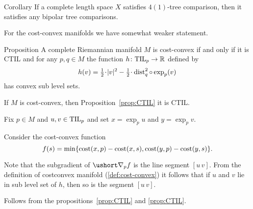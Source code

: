 \begin{thm}{Corollary}\label{cor:4(1)=>n(1)}
If a complete length space $X$ satisfies $4(1)$-tree comparison, then it satisfies any bipolar tree comparisons.
\end{thm}

For the cost-convex manifolds we have somewhat weaker statement.

\begin{thm}{Proposition}\label{prop:convexity}
A complete Riemannian manifold $M$ is cost-convex if and only if it is CTIL and
for any $p,q\in M$ the function $h\colon \mathrm{\rm TIL}_p\to \mathbb{R}$ defined by
\[h(v)=\tfrac12\cdot|v|^2-\tfrac12\cdot\dist_q^2\circ\exp_p(v)\] 
has convex sub level sets.
\end{thm}

If $M$ is cost-convex, then Proposition~\ref{prop:CTIL} it is CTIL.

Fix $p\in M$ and $u,v\in \mathrm{\rm TIL}_p$
and set $x=\exp_pu$ and $y=\exp_pv$.

Consider the cost-convex function 
\[f(s)=\min\{\text{\rm cost}(x,p)-\text{\rm cost}(x,s),\text{\rm cost}(y,p)-\text{\rm cost}(y,s)\}.\]

Note that the subgradient of $\ushort\nabla_pf$ is the line segment $[u\,v]$.
From the definition of costconvex manifold (\ref{def:cost-convex}) it follows that if $u$ and $v$ lie in sub level set of $h$, then so is the segment $[u\,v]$.

 Follows from the propositions~\ref{prop:CTIL} and \ref{prop:CTIL}.
\qeds
